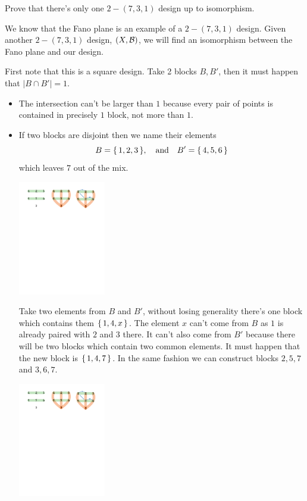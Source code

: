 \documentclass[12pt]{memoir}
\begin{document}
\begin{Ej}[Exercise 2]
    Prove that there's only one $2-(7,3,1)$ design up to isomorphism.
\end{Ej}

\begin{ptcbr}
    We know that the Fano plane is an example of a $2-(7,3,1)$ design. Given another $2-(7,3,1)$ design, $(X,\mathcal{B})$, we will find an isomorphism between the Fano plane and our design.\par 
    First note that this is a square design. Take 2 blocks $B,B'$, then it must happen that $|B\cap B'|=1$.
    \begin{itemize}
        \itemsep=-0.4em
        \item The intersection can't be larger than $1$ because every pair of points is contained in precisely $1$ block, not more than $1$.
        \item If two blocks are disjoint then we name their elements
        $$B=\{\,1,2,3\,\},\quad\text{and}\quad B'=\{\,4,5,6\,\}$$
        which leaves $7$ out of the mix. 
        \begin{center}
            \includegraphics[width=0.3\textwidth, trim= 2.1cm 21.8cm 14cm 1.9cm,clip]{fig1.pdf}
        \end{center}
        Take two elements from $B$ and $B'$, without losing generality there's one block which contains them $\{\,1,4,x\,\}$. The element $x$ can't come from $B$ as $1$ is already paired with $2$ and $3$ there. It can't also come from $B'$ because there will be two blocks which contain two common elements. It must happen that the new block is $\{\,1,4,7\,\}$. In the same fashion we can construct blocks ${2,5,7}$ and ${3,6,7}$. 
        \begin{center}
            \includegraphics[width=0.3\textwidth, trim= 8cm 21.8cm 8cm 1.9cm,clip]{fig1.pdf}

\end{center}
\end{itemize}
\end{ptcbr}
\end{document}
